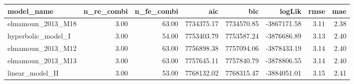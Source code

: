 \begin{table}[ht]
\centering
\begin{tabular}{lrrrrrrr}
  \hline
model\_name & n\_re\_combi & n\_fe\_combi & aic & bic & logLik & rmse & mae \\ 
  \hline
elmamoun\_2013\_M18 & 3.00 & 63.00 & 7734375.17 & 7734570.85 & -3867171.58 & 3.11 & 2.38 \\ 
  hyperbolic\_model\_I & 3.00 & 54.00 & 7753403.79 & 7753587.24 & -3876686.89 & 3.13 & 2.40 \\ 
  elmamoun\_2013\_M12 & 3.00 & 63.00 & 7756898.38 & 7757094.06 & -3878433.19 & 3.14 & 2.40 \\ 
  elmamoun\_2013\_M13 & 3.00 & 63.00 & 7757645.11 & 7757840.79 & -3878806.55 & 3.14 & 2.40 \\ 
  linear\_model\_II & 3.00 & 53.00 & 7768132.02 & 7768315.47 & -3884051.01 & 3.15 & 2.41 \\ 
   \hline
\end{tabular}
\end{table}
